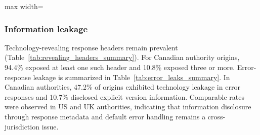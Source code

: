 \documentclass[conference]{IEEEtran}
\begin{document}
\begin{table}[t]
    \caption{Cookie security flag adoption by country and sector.}
    \label{tab:cookie_security_flags}
    \centering
    \scriptsize
    \setlength{\tabcolsep}{3pt}
    \renewcommand{\arraystretch}{1.15}
    
    \begin{adjustbox}{max width=\columnwidth}
    \end{adjustbox}
  \end{table}

\subsubsection{Information leakage}
Technology-revealing response headers remain prevalent (Table~\ref{tab:revealing_headers_summary}). For Canadian authority origins, 94.4\% exposed at least one such header and 10.8\% exposed three or more. 
Error-response leakage is summarized in Table~\ref{tab:error_leaks_summary}. In Canadian authorities, 47.2\% of origins exhibited technology leakage in error responses and 10.7\% disclosed explicit version information. 
Comparable rates were observed in US and UK authorities, indicating that information disclosure through response metadata and default error handling remains a cross-jurisdiction issue. 
\end{document}
